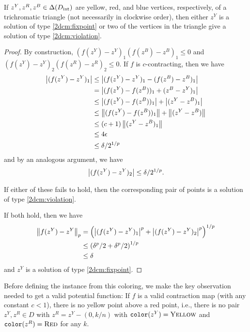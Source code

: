  \begin{lemma}
      \label{lemma:TrichromaticTriangles}
    If $z^Y,z^R,z^B \in \Delta(D_{\mathrm{int}})$ are yellow, red, and blue vertices, respectively, of a trichromatic triangle (not necessarily in clockwise order), then either $z^Y$ is a solution of type \ref{2dcm:fixpoint} or two of the vertices in the triangle give a solution of type \ref{2dcm:violation}.
  \end{lemma}
  \begin{proof}
    By construction, $(f(z^Y) - z^Y)_1 (f(z^B) - z^B)_1 \leq 0$ and $(f(z^Y) - z^Y)_2 (f(z^R) - z^R)_2 \leq 0$.
    If $f$ is $c$-contracting, then we have 
    \begin{align*}
      \left| (f(z^Y) - z^Y)_1 \right| &\leq \left| (f(z^Y) - z^Y)_1 - (f(z^B) - z^B)_1 \right|\\
                             &= \left| (f(z^Y) - f(z^B))_1 + (z^B - z^Y)_1 \right|\\
                             &\leq \left| (f(z^Y) - f(z^B))_1 \right| + \left| (z^Y - z^B)_1 \right|\\
                             &\leq \left\| (f(z^Y) - f(z^B))_1 \right\| + \left\| (z^Y - z^B) \right\|\\
                             &\leq (c+1)\left\| (z^Y - z^B)_1 \right\|\\
                             &\leq 4\epsilon\\
                             &\leq \delta/2^{1/p}
    \end{align*}  and by an analogous argument, we have
    \[ \left| (f(z^Y) - z^Y)_2 \right| \leq \delta/2^{1/p}\text{.} \]

    If either of these fails to hold, then the corresponding pair of points is a solution of type \ref{2dcm:violation}.

    If both hold, then we have
    \begin{align*}
      \left\| f(z^Y) - z^Y \right\|_p &= \left( \left| (f(z^Y) - z^Y)_1 \right|^p + \left| (f(z^Y) - z^Y)_2 \right|^p \right)^{1/p} \\
                          &\leq \left( \delta^p/2 + \delta^p/2 \right)^{1/p}\\
                          &\leq \delta
    \end{align*} and $z^Y$ is a solution of type \ref{2dcm:fixpoint}.
  \end{proof}

  Before defining the \EOPL instance from this coloring, we make the key observation needed to get a valid potential function: If $f$ is a valid contraction map (with any constant $c < 1$), there is no yellow point above a red point, i.e., there is no pair $z^Y,z^R \in D$ with $z^R = z^Y - (0,k/n)$ with $\operatorname{\texttt{color}}(z^Y) = \textsc{Yellow}$ and $\operatorname{\texttt{color}}(z^R) = \textsc{Red}$ for any $k$. 

